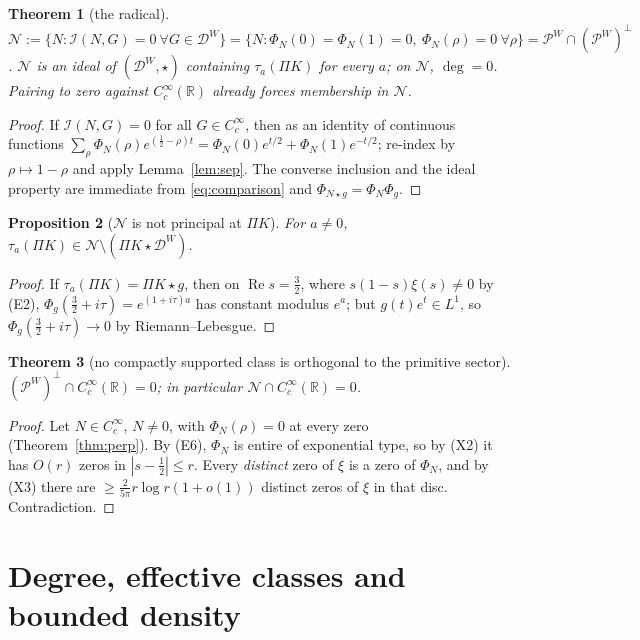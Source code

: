 \documentclass[11pt]{amsart}
\newtheorem{theorem}{Theorem}[section]
\newtheorem{proposition}[theorem]{Proposition}
\theoremstyle{definition}
\theoremstyle{remark}
\newcommand{\R}{\mathbb R}
\newcommand{\Rel}{\operatorname{Re}}
\newcommand{\DW}{\mathcal D^{W}}
\newcommand{\PW}{\mathcal P^{W}}
\newcommand{\Nr}{\mathcal N}
\newcommand{\I}{\mathcal I}
\newcommand{\dg}{\deg}
\begin{document}
\begin{theorem}[the radical]\label{thm:radical}
$\Nr:=\{N:\I(N,G)=0\ \forall G\in\DW\}=\{N:\Phi_N(0)=\Phi_N(1)=0,\ \Phi_N(\rho)=0\ \forall\rho\}=\PW\cap(\PW)^\perp$.
$\Nr$ is an ideal of $(\DW,\star)$ containing $\tau_a(\Pi K)$ for every $a$; on $\Nr$, $\dg=0$. Pairing to zero
against $C_c^\infty(\R)$ already forces membership in $\Nr$.
\end{theorem}
\begin{proof}
If $\I(N,G)=0$ for all $G\in C_c^\infty$, then as an identity of continuous functions
$\sum_\rho\Phi_N(\rho)e^{(\frac12-\rho)t}=\Phi_N(0)e^{t/2}+\Phi_N(1)e^{-t/2}$; re-index by $\rho\mapsto1-\rho$ and apply
Lemma~\ref{lem:sep}. The converse inclusion and the ideal property are immediate from \eqref{eq:comparison}
and $\Phi_{N\star g}=\Phi_N\Phi_g$.
\end{proof}

\begin{proposition}[$\Nr$ is not principal at $\Pi K$]\label{prop:notprincipal}
For $a\ne0$, $\tau_a(\Pi K)\in\Nr\setminus(\Pi K\star\DW)$.
\end{proposition}
\begin{proof}
If $\tau_a(\Pi K)=\Pi K\star g$, then on $\Rel s=\frac32$, where $s(1-s)\xi(s)\ne0$ by (E2),
$\Phi_g(\frac32+i\tau)=e^{(1+i\tau)a}$ has constant modulus $e^a$; but $g(t)e^t\in L^1$, so
$\Phi_g(\frac32+i\tau)\to0$ by Riemann--Lebesgue.
\end{proof}

\begin{theorem}[no compactly supported class is orthogonal to the primitive sector]\label{thm:compactrad}
$(\PW)^\perp\cap C_c^\infty(\R)=0$; in particular $\Nr\cap C_c^\infty(\R)=0$.
\end{theorem}
\begin{proof}
Let $N\in C_c^\infty$, $N\ne0$, with $\Phi_N(\rho)=0$ at every zero (Theorem~\ref{thm:perp}). By (E6),
$\Phi_N$ is entire of exponential type, so by (X2) it has $O(r)$ zeros in $|s-\frac12|\le r$. Every
\emph{distinct} zero of $\xi$ is a zero of $\Phi_N$, and by (X3) there are
$\ge\frac2{5\pi}r\log r(1+o(1))$ distinct zeros of $\xi$ in that disc. Contradiction.
\end{proof}

\section{Degree, effective classes and bounded density}\label{sec:degree}
\end{document}
